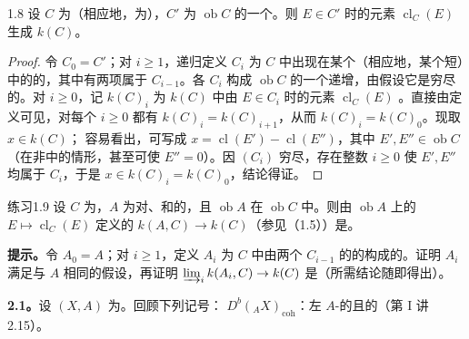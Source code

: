 \begin{SGAresult}{}{1.8}
设 $C$ 为（相应地，为），$C'$ 为 $\operatorname{ob}C$ 的一个。则 $E\in C'$ 时的元素 $\operatorname{cl}_C(E)$ 生成 $k(C)$。
\end{SGAresult}
\begin{proof}
令 $C_0=C'$；对 $i\geq1$，递归定义 $C_i$ 为 $C$ 中出现在某个（相应地，某个短）中的的，其中有两项属于 $C_{i-1}$。各 $C_i$ 构成 $\operatorname{ob}C$ 的一个递增，由假设它是穷尽的。对 $i\geq0$，记 $k(C)_i$ 为 $k(C)$ 中由 $E\in C_i$ 时的元素 $\operatorname{cl}_C(E)$ 。直接由定义可见，对每个 $i\geq0$ 都有 $k(C)_i=k(C)_{i+1}$，从而 $k(C)_i=k(C)_0$。现取 $x\in k(C)$；
容易看出，可写成 $x=\operatorname{cl}(E')-\operatorname{cl}(E'')$，其中 $E',E''\in\operatorname{ob}C$（在非中的情形，甚至可使 $E''=0$）。因 $(C_i)$ 穷尽，存在整数 $i\geq0$ 使 $E',E''$ 均属于 $C_i$，于是 $x\in k(C)_i=k(C)_0$，结论得证。
\end{proof}

\begin{SGAresult}{练习}{1.9}
设 $C$ 为，$A$ 为对、和的，且 $\operatorname{ob}A$ 在 $\operatorname{ob}C$ 中。则由 $\operatorname{ob}A$ 上的 $E\mapsto\operatorname{cl}_C(E)$ 定义的 $k(A,C)\to k(C)$（参见（1.5））是。
\end{SGAresult}
\textbf{提示。}令 $A_0=A$；对 $i\geq1$，定义 $A_i$ 为 $C$ 中由两个 $C_{i-1}$ 的的构成的。证明 $A_i$ 满足与 $A$ 相同的假设，再证明 $\varinjlim_i k(A_i,C)\to k(C)$ 是（所需结论随即得出）。

\textbf{2.1。}设 $(X,A)$ 为。回顾下列记号：
$D^b({}_AX)_{\mathrm{coh}}$：左 $A$-的且的（第 I 讲 2.15）。

